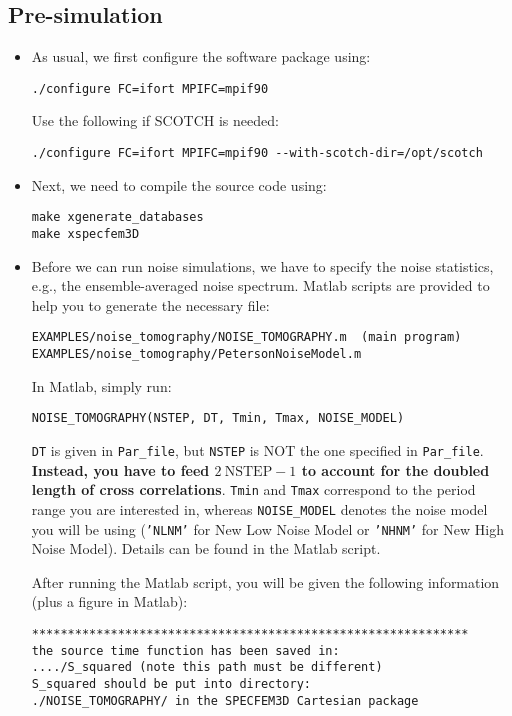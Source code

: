 \subsection{Pre-simulation}
\begin{itemize}
\item As usual, we first configure the software package using:
\begin{verbatim}
./configure FC=ifort MPIFC=mpif90
\end{verbatim}

Use the following if SCOTCH is needed:
\begin{verbatim}
./configure FC=ifort MPIFC=mpif90 --with-scotch-dir=/opt/scotch
\end{verbatim}

\item Next, we need to compile the source code using:
\begin{verbatim}
make xgenerate_databases
make xspecfem3D
\end{verbatim}

\item Before we can run noise simulations, we have to specify the noise
statistics, e.g., the ensemble-averaged noise spectrum. Matlab scripts
are provided to help you to generate the necessary file:
\begin{verbatim}
EXAMPLES/noise_tomography/NOISE_TOMOGRAPHY.m  (main program)
EXAMPLES/noise_tomography/PetersonNoiseModel.m
\end{verbatim}

In Matlab, simply run:
\begin{verbatim}
NOISE_TOMOGRAPHY(NSTEP, DT, Tmin, Tmax, NOISE_MODEL)
\end{verbatim}

\texttt{DT} is given in \texttt{Par\_file}, but {\color{red} \texttt{NSTEP} is
NOT the one specified in \texttt{Par\_file}}. {\bf Instead, you have to
feed $2~\mathrm{NSTEP}-1$ to account for the doubled length of cross
correlations}. \texttt{Tmin} and \texttt{Tmax} correspond to the period
range you are interested in, whereas \texttt{NOISE\_MODEL} denotes
the noise model you will be using
(\texttt{'NLNM'} for New Low Noise Model or \texttt{'NHNM'} for New High Noise Model).
Details can be found in the Matlab script.


After running the Matlab script, you will be given the following information
(plus a figure in Matlab):
\begin{verbatim}
*************************************************************
the source time function has been saved in:
..../S_squared (note this path must be different)
S_squared should be put into directory:
./NOISE_TOMOGRAPHY/ in the SPECFEM3D Cartesian package
\end{verbatim}


\end{itemize}
